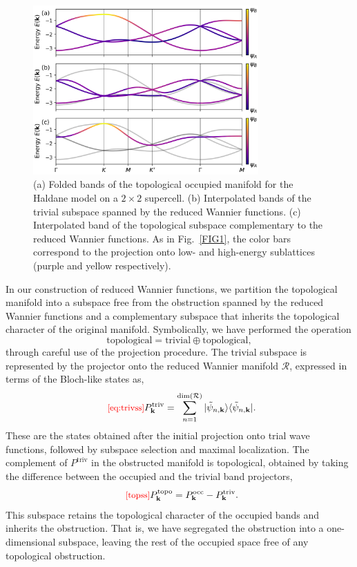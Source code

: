 \documentclass[galley,aps,pra,10pt,amsmath,amssymb,
    superscriptaddress,nofootinbib,longbibliography]{revtex4-2}
\def\Red#1{\textcolor{red}{#1}}
\newcounter{comm}
\newcommand{\eqlab}[1]{\Red{\hbox{\small\;\;[#1]}}\label{eq:#1}}
\newcommand{\eqlab}[1]{\label{eq:#1}}
\begin{document}
\begin{figure}[t!]
\begin{center}
\includegraphics[width=3.4in]{fig5.png}
\end{center}
\vspace{-5mm}
\caption{(a) Folded bands of the topological occupied manifold for the Haldane model on a $2\times 2$ supercell. (b) Interpolated bands of the trivial subspace spanned by the reduced Wannier functions. (c) Interpolated band of the topological subspace complementary to the reduced Wannier functions. As in Fig.~\ref{FIG1}, the color bars correspond to the projection onto low- and high-energy sublattices (purple and yellow respectively).}
\label{FIG5}
\end{figure}

In our construction of reduced Wannier functions, we partition the topological manifold into a subspace free from the obstruction spanned by the reduced Wannier functions and a complementary subspace that inherits the topological character of the original manifold. Symbolically, we have performed the operation
\begin{equation}
    \text{topological} = \text{trivial} \oplus \text{topological},
\end{equation}
through careful use of the projection procedure. The trivial subspace is represented by the projector onto the reduced Wannier manifold $\mathcal{R}$, expressed in terms of the Bloch-like states as, 
\begin{equation}
\eqlab{eq:trivss}
    P^{\text{triv}}_{\mathbf{k}} = \sum_{n=1}^{\dim({\mathcal{R}})} |\tilde{\psi}_{n,\mathbf{k}} \rangle \langle \tilde{\psi}_{n,\mathbf{k}}|.
\end{equation}
These are the states obtained after the initial projection onto trial wave functions, followed by subspace selection and maximal localization. The complement of $P^{\text{triv}}$ in the obstructed manifold is topological, obtained by taking the difference between the occupied and the trivial band projectors, 
\begin{equation}
\eqlab{topss}
P^{\text{topo}}_{\mathbf{k}}= P^{\text{occ}}_{\mathbf{k}} - P^{\text{triv}}_{\mathbf{k}}.
\end{equation}
This subspace retains the topological character of the occupied bands and inherits the obstruction. That is, we have segregated the obstruction into a one-dimensional subspace, leaving the rest of the occupied space free of any topological obstruction.
\end{document}
